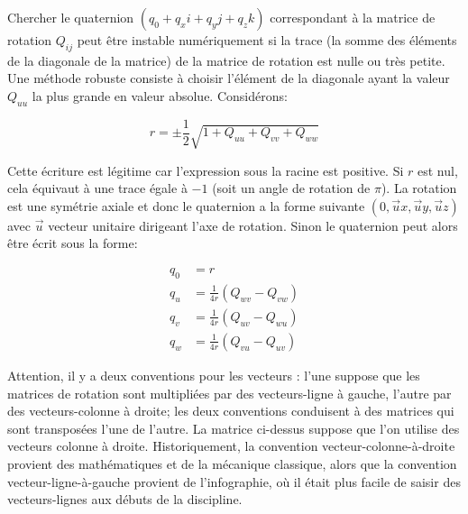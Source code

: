 Chercher le quaternion $(q_{0} + q_{x}i+q_{y}j + q_{z}k)$ correspondant à 
la matrice de rotation $Q_{ij}$ peut être instable numériquement si la trace
(la somme des éléments de la diagonale de la matrice) de la matrice de rotation 
est nulle ou très petite.
Une méthode robuste consiste à choisir l'élément de la diagonale ayant la valeur
$Q_{uu}$ la plus grande en valeur absolue. Considérons:

\[
r = \pm \frac{1}{2} \sqrt{1 + Q_{uu} + Q_{vv} + Q_{ww}}
\]

Cette écriture est légitime car l'expression sous la racine est positive. 
Si $r$ est nul, cela équivaut à une trace égale à $ - 1$ (soit un angle de rotation de $\pi$). La rotation est une symétrie axiale et donc le quaternion a la 
forme suivante $(0, \vec{u} x, \vec{u} y, \vec{u} z)$ avec $\vec{u}$ vecteur
unitaire dirigeant l'axe de rotation. Sinon le quaternion peut alors être 
écrit sous la forme:

\begin{align*}
	q_{0} &= r \\
	q_{u} &= \frac{1}{4r}(Q_{wv} - Q_{vw}) \\
	q_{v} &= \frac{1}{4r}(Q_{uv} - Q_{wu}) \\
	q_{w} &= \frac{1}{4r}(Q_{vu} - Q_{uv})
\end{align*}

Attention, il y a deux conventions pour les vecteurs : l'une suppose que les matrices de rotation 
sont multipliées par des vecteurs-ligne à gauche, l'autre par des vecteurs-colonne à droite; 
les deux conventions conduisent à des matrices qui sont transposées l'une de l'autre. 
La matrice ci-dessus suppose que l'on utilise des vecteurs colonne à droite. Historiquement, 
la convention vecteur-colonne-à-droite provient des mathématiques et de la mécanique classique, 
alors que la convention vecteur-ligne-à-gauche provient de l'infographie, où il était plus 
facile de saisir des vecteurs-lignes aux débuts de la discipline.
